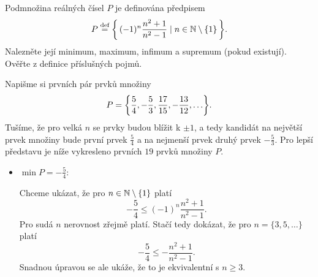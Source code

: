 \documentclass[answers]{exam}
\begin{document}
\begin{questions}
\begin{solution}
  \end{solution}
  
  \question[2] Podmnožina reálných čísel $P$ je definována předpisem 
  \begin{equation*}
    P \defeq \set{(-1)^n \frac{n^2 + 1}{n^2 - 1}}{n \in \N \setminus \{1\}}.
  \end{equation*}
  Nalezněte její minimum, maximum, infimum a supremum (pokud existují). Ověřte z definice příslušných pojmů.
  
  \begin{solution}
    Napišme si prvních pár prvků množiny
    \begin{equation*}
      P = \braces{\frac{5}{4}, -\frac{5}{3}, \frac{17}{15}, -\frac{13}{12}, \dots}.
    \end{equation*}
    Tušíme, že pro velká $n$ se prvky budou blížit k $\pm 1$, a tedy kandidát na největší prvek množiny bude první prvek $\frac{5}{4}$ a na nejmenší prvek druhý prvek $-\frac{5}{3}$. Pro lepší představu je níže vykresleno prvních $19$ prvků množiny $P$.
    \begin{center}
    \end{center}

    \begin{itemize}
      \item $\min P = - \frac{5}{4}$: 
      
        Chceme ukázat, že pro $n \in \mathbb{N} \setminus \{1\}$ platí 
        \begin{equation*}
          - \frac{5}{4}
          \le
          (-1)^n \frac{n^2 + 1}{n^2 - 1}.
        \end{equation*}
        Pro sudá $n$ nerovnost zřejmě platí. Stačí tedy dokázat, že pro $n = \{3, 5, \dots\}$ platí
        \begin{equation*}
          - \frac{5}{4}
          \le
          -
          \frac{n^2 + 1}{n^2 - 1}.
        \end{equation*}
        Snadnou úpravou se ale ukáže, že to je ekvivalentní s $n \ge 3$.
      

\end{itemize}
\end{solution}
\end{questions}
\end{document}
